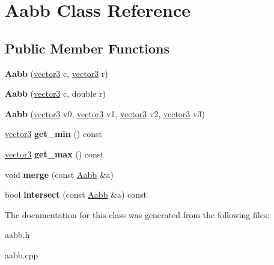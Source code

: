 \hypertarget{class_aabb}{
\section{Aabb Class Reference}
\label{class_aabb}
}
\subsection*{Public Member Functions}
\begin{DoxyCompactItemize}
\item 
\hypertarget{class_aabb_a7f626bda34befb489b15a0fd854a04fa}{
{\bfseries Aabb} (\hyperlink{classvector3d}{vector3} c, \hyperlink{classvector3d}{vector3} r)}
\label{class_aabb_a7f626bda34befb489b15a0fd854a04fa}

\item 
\hypertarget{class_aabb_a719ed8a82241cc08731c94809403701b}{
{\bfseries Aabb} (\hyperlink{classvector3d}{vector3} c, double r)}
\label{class_aabb_a719ed8a82241cc08731c94809403701b}

\item 
\hypertarget{class_aabb_aa83a61b3bc44865060ea243ff7df8a1c}{
{\bfseries Aabb} (\hyperlink{classvector3d}{vector3} v0, \hyperlink{classvector3d}{vector3} v1, \hyperlink{classvector3d}{vector3} v2, \hyperlink{classvector3d}{vector3} v3)}
\label{class_aabb_aa83a61b3bc44865060ea243ff7df8a1c}

\item 
\hypertarget{class_aabb_ad7deb23c4af50cba66bb9190f48f3c3f}{
\hyperlink{classvector3d}{vector3} {\bfseries get\_\-min} () const }
\label{class_aabb_ad7deb23c4af50cba66bb9190f48f3c3f}

\item 
\hypertarget{class_aabb_a3022a403e1d38384be7eba5803b30719}{
\hyperlink{classvector3d}{vector3} {\bfseries get\_\-max} () const }
\label{class_aabb_a3022a403e1d38384be7eba5803b30719}

\item 
\hypertarget{class_aabb_aebf5f3eb06aca43ac967a1f3b639a8f1}{
void {\bfseries merge} (const \hyperlink{class_aabb}{Aabb} \&a)}
\label{class_aabb_aebf5f3eb06aca43ac967a1f3b639a8f1}

\item 
\hypertarget{class_aabb_a667af895bfa0119727c7d2f6a500bab8}{
bool {\bfseries intersect} (const \hyperlink{class_aabb}{Aabb} \&a) const }
\label{class_aabb_a667af895bfa0119727c7d2f6a500bab8}

\end{DoxyCompactItemize}


The documentation for this class was generated from the following files:\begin{DoxyCompactItemize}
\item 
aabb.h\item 
aabb.cpp\end{DoxyCompactItemize}
